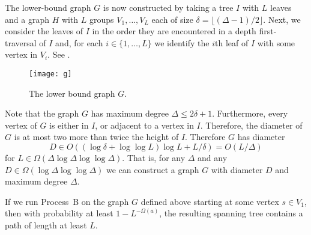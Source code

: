 \documentclass[lotsofwhite]{patmorin}
\begin{document}
The lower-bound graph $G$ is now constructed by taking a tree $I$ with
$L$ leaves and a graph $H$ with $L$ groups $V_1,\ldots,V_L$ each of size
$\delta=\lfloor(\Delta-1)/2\rfloor$.  Next, we consider the leaves of
$I$ in the order they are encountered in a depth first-traversal of $I$
and, for each $i\in\{1,\ldots,L\}$ we identify the $i$th leaf of $I$
with some vertex in $V_i$.  See .

\begin{figure}
  \begin{center}
    \texttt{[image: g]}
  \end{center}
  \caption{The lower bound graph $G$.}
\end{figure}

Note that the graph $G$ has maximum degree $\Delta\le 2\delta+1$.
Furthermore, every vertex of $G$ is either in $I$, or adjacent to a
vertex in $I$.  Therefore, the diameter of $G$ is at most two more than
twice the height of $I$. Therefore $G$ has diameter
\[
   D\in O((\log\delta + \log\log L)\log L + L/\delta) = O(L/\Delta)
\]
for $L\in\Omega(\Delta\log\Delta\log\log\Delta)$.  That is, for any
$\Delta$ and any $D\in\Omega(\log\Delta\log\log\Delta)$ we can construct
a graph $G$ with diameter $D$ and maximum degree $\Delta$.

\begin{thm}
  If we run Process~B on the graph $G$ defined above starting at some
  vertex $s\in V_1$, then with probability at least $1-L^{-\Omega(a)}$,
  the resulting spanning tree contains a path of length at least $L$.
\end{thm}
\end{document}
